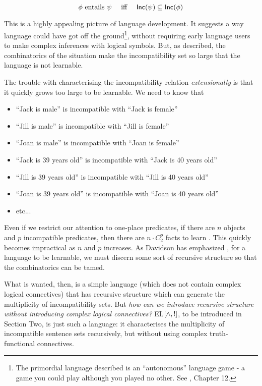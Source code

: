 \[
   \phi \mbox{ entails } \psi \quad \mbox{ iff }\quad \mathsf{Inc}(\psi) \subseteq \mathsf{Inc}(\phi)
\]

\NI This is a highly appealing picture of language development.  It
suggests a way language could have got off the ground\footnote{The
  primordial language described is an ``autonomous'' language game - a
  game you could play although you played no other. See
  \cite{brandom3}, Chapter 12.}, without requiring early language
users to make complex inferences with logical symbols.  But, as
described, the combinatorics of the situation make the incompatibility
set so large that the language is not learnable.

The trouble with characterising the incompatibility relation
\emph{extensionally} is that it quickly grows too large to be
learnable. We need to know that

\begin{itemize}

\item ``Jack is male'' is incompatible with ``Jack is female''
\item ``Jill is male'' is incompatible with ``Jill is female''
\item ``Joan is male'' is incompatible with ``Joan is female''
\item ``Jack is 39 years old'' is incompatible with ``Jack is 40 years old''
\item ``Jill is 39 years old'' is incompatible with ``Jill is 40 years old''
\item ``Joan is 39 years old'' is incompatible with ``Joan is 40 years old''
\item etc...

\end{itemize}

\NI Even if we restrict our attention to one-place predicates, if
there are $n$ objects and $p$ incompatible predicates, then there are
$n\cdot C^p_2$ facts to learn .  This quickly becomes impractical as $n$ and
$p$ increases.  As Davidson has emphasized \cite{davidson}, for a
language to be learnable, we must discern some sort of recursive
structure so that the combinatorics can be tamed.

What is wanted, then, is a simple language (which does not contain
complex logical connectives) that has recursive structure which can
generate the multiplicity of incompatibility sets.  But \emph{how can
  we introduce recursive structure without introducing complex logical
  connectives?} EL$[\land, !]$, to be introduced in Section Two, is
just such a language: it characterises the multiplicity of
incompatible sentence sets recursively, but without using complex
truth-functional connectives.

